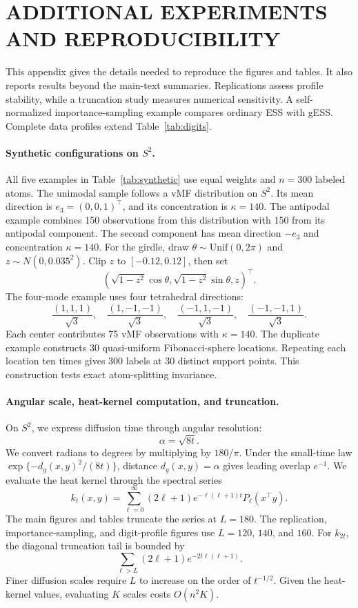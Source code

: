 \documentclass[twoside]{article}
\theoremstyle{definition}
\theoremstyle{remark}
\begin{document}
\section{ADDITIONAL EXPERIMENTS AND REPRODUCIBILITY}
\label{app:add_experiments}

This appendix gives the details needed to reproduce the figures and tables. It also reports results beyond the main-text summaries. Replications assess profile stability, while a truncation study measures numerical sensitivity. A self-normalized importance-sampling example compares ordinary ESS with gESS. Complete data profiles extend Table~\ref{tab:digits}.

\paragraph{Synthetic configurations on $S^2$.}
All five examples in Table~\ref{tab:synthetic} use equal weights and $n=300$ labeled atoms. The unimodal sample follows a vMF distribution on $S^2$. Its mean direction is $e_3=(0,0,1)^\top$, and its concentration is $\kappa=140$. The antipodal example combines 150 observations from this distribution with 150 from its antipodal component. The second component has mean direction $-e_3$ and concentration $\kappa=140$. For the girdle, draw $\theta\sim\mathrm{Unif}(0,2\pi)$ and $z\sim N(0,0.035^2)$. Clip $z$ to $[-0.12,0.12]$, then set
\[
  (\sqrt{1-z^2}\cos\theta,\sqrt{1-z^2}\sin\theta,z)^\top.
\]
The four-mode example uses four tetrahedral directions:
\[
  \frac{(1,1,1)}{\sqrt3},\quad
  \frac{(1,-1,-1)}{\sqrt3},\quad
  \frac{(-1,1,-1)}{\sqrt3},\quad
  \frac{(-1,-1,1)}{\sqrt3}.
\]
Each center contributes 75 vMF observations with $\kappa=140$. The duplicate example constructs 30 quasi-uniform Fibonacci-sphere locations. Repeating each location ten times gives 300 labels at 30 distinct support points. This construction tests exact atom-splitting invariance.

\paragraph{Angular scale, heat-kernel computation, and truncation.}
On $S^2$, we express diffusion time through angular resolution:
\[
  \alpha=\sqrt{8t}.
\]
We convert radians to degrees by multiplying by $180/\pi$. Under the small-time law $\exp\{-d_g(x,y)^2/(8t)\}$, distance $d_g(x,y)=\alpha$ gives leading overlap $e^{-1}$. We evaluate the heat kernel through the spectral series
\[
  k_t(x,y)=\sum_{\ell=0}^{\infty}(2\ell+1)e^{-\ell(\ell+1)t}
  P_\ell(x^\top y).
\]
The main figures and tables truncate the series at $L=180$. The replication, importance-sampling, and digit-profile figures use $L=120$, $140$, and $160$. For $k_{2t}$, the diagonal truncation tail is bounded by
\[
  \sum_{\ell>L}(2\ell+1)e^{-2t\ell(\ell+1)}.
\]
Finer diffusion scales require $L$ to increase on the order of $t^{-1/2}$. Given the heat-kernel values, evaluating $K$ scales costs $O(n^2K)$.
\end{document}
